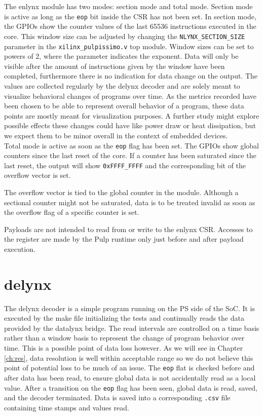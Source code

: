 \documentclass[../bachelor_paper.tex]{subfiles}
\begin{document}
The enlynx module has two modes: section mode and total mode. Section mode is active as long as the \texttt{eop} bit inside the \ac{CSR} has not been set. In section mode, the GPIOs show the counter values of the last 65536
instructions executed in the core. This window size can be adjusted by changing the \texttt{NLYNX\_SECTION\_SIZE} parameter in the \texttt{xilinx\_pulpissimo.v} top module. Window sizes can be set to powers of 2, where the parameter indicates the exponent. Data will only be visible after the amount of instructions given by the window have been completed, furthermore there is no indication for data change on the output. The values are collected regularly by the delynx decoder and are solely meant to visualize behavioral changes of programs over time. As the metrics recorded have been chosen to be able to represent overall behavior of a program, these data points are mostly meant for visualization purposes. A further study might explore possible effects these changes could have like power draw or heat dissipation, but we expect them to be minor overall in the context of embedded devices.\\
Total mode is active as soon as the \texttt{eop} flag has been set. The GPIOs show global counters since the last reset of the core. If a counter has been saturated since the last reset, the output will show \texttt{0xFFFF\_FFFF} and the corresponding bit of the overflow vector is set.

The overflow vector is tied to the global counter in the module. Although a sectional counter might not be saturated, data is to be treated invalid as soon as the overflow flag of a specific counter is set.

Payloads are not intended to read from or write to the enlynx \ac{CSR}. Accesses to the register are made by the Pulp runtime only just before and after payload execution.

\section{delynx}
The delynx decoder is a simple program running on the \ac{PS} side of the \ac{SoC}. It is executed by the make file initializing the tests and continually reads the data provided by the datalynx bridge. The read intervals are controlled on a time basis rather than a window basis to represent the change of program behavior over time. This is a possible point of data loss however. As we will see in Chapter \ref{ch:res}, data resolution is well within acceptable range so we do not believe this point of potential loss to be much of an issue. The \texttt{eop} flat is checked before and after data has been read, to ensure global data is not accidentally read as a local value. After a transition on the \texttt{eop} flag has been seen, global data is read, saved, and the decoder terminated. Data is saved into a corresponding \texttt{.csv} file containing time stamps and values read.
\end{document}
